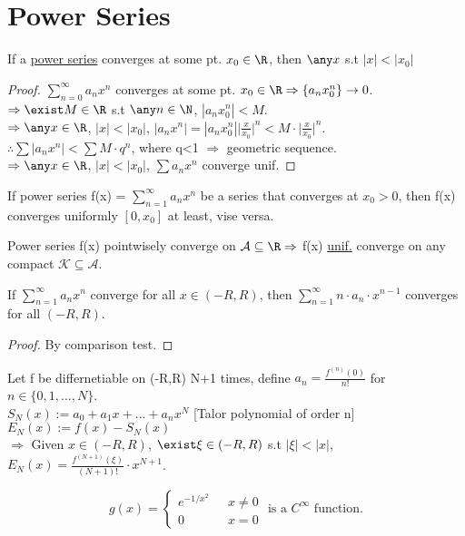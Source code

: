\section{Power Series}
\begin{theorem}
    If a \uline{power series} converges at some pt. $x_0 \in \R$, then $\any x$ s.t $|x| < |x_0|$
\end{theorem}
\begin{proof}
    $\sum_{n=0}^\infty a_n x^n$ converges at some pt. $x_0 \in \R \Rightarrow \{a_n x_0^n \} \rightarrow 0$. \\
    $\Rightarrow \exist M \in \R$ s.t $\any n \in \N$, $|a_n x^n_0| < M$. \\ 
    $\Rightarrow \any x \in \R$, $|x| < |x_0|$, $|a_n x^n| = |a_n x^n_0|\big| \frac{x}{x_0} \big| ^n < M \cdot \big| \frac{x}{x_0} \big| ^n$. \\
    $\therefore \sum |a_n x^n| < \sum M \cdot q^n$, where q<1 $\Rightarrow$ geometric sequence. \\
    $\Rightarrow \any x \in \R$, $|x| < |x_0|$, $\sum a_n x^n$ converge unif. 
\end{proof}
\begin{theorem}
\label{Abet's Theorem}
    If power series f(x) = $\sum^\infty_{n=1} a_n x^n$ be a series that converges at $x_0>0$, then f(x) converges uniformly $[0, x_0]$ at least, vise versa.
\end{theorem}
\begin{theorem}
    Power series f(x) pointwisely converge on $\mathcal{A} \subseteq \R \Rightarrow$ f(x) \uline{unif.} converge on any compact $\mathcal{K} \subseteq \mathcal{A}$. %
\end{theorem}
\begin{theorem}
    If $\sum^\infty_{n=1} a_n x^n$ converge for all $x \in (-R, R)$, then $\sum^\infty_{n=1} n\cdot a_n \cdot x^{n-1}$ converges for all $(-R, R)$.
\end{theorem}
\begin{proof}
    By comparison test.
\end{proof}
\begin{theorem}
\label{Lagrange's Reminder Theorem}
   Let f be differnetiable on (-R,R) N+1 times, define $a_n = \frac{f^{(n)}(0)}{n!}$ for $n \in \{0, 1, ..., N\}$. \\
   $S_N (x):= a_0 + a_1 x + ... + a_n x^N$ [Talor polynomial of order n] \\
   $E_N (x):= f(x) - S_N(x)$ \\
   $\Rightarrow$ Given $x \in (-R,R)$, $\exist \xi \in (-R, R)$ s.t $|\xi|<|x|$, $E_N (x) = \frac{f^{(N+1)}(\xi)}{(N+1)!}\cdot x^{N+1}$. 
\end{theorem}
\begin{example}
    \[
    g(x) =
    \begin{cases}
        e^{-1/x^2} &\text{ } x \neq 0 \\
        0 &\text{ } x=0
    \end{cases}
    \text{ is a }C^\infty\text{ function}.
    \]
\end{example}
